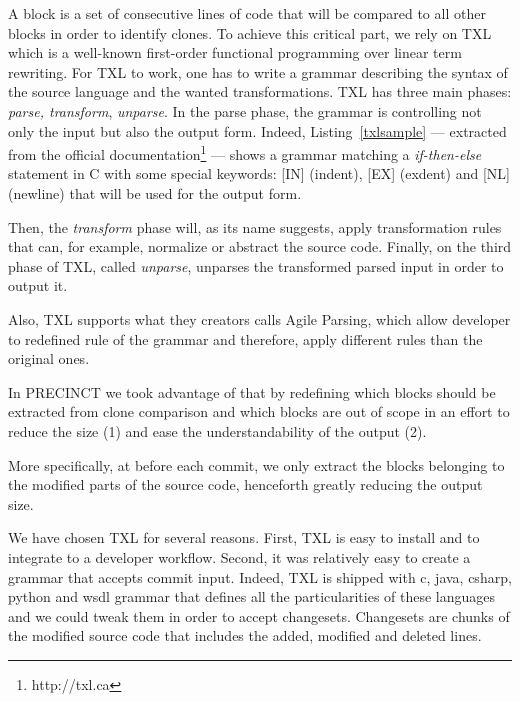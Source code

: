 \documentclass[conference]{IEEEtran}
\begin{document}
A block is a set of consecutive lines of code that will be compared to all other blocks in order to identify clones.
To achieve this critical part, we rely on TXL\cite{Cordy2006a} which is a well-known first-order functional programming over linear term rewriting.
For TXL to work, one has to write a grammar describing the syntax of the source  language and the wanted transformations.
TXL has three main phases: \textit{parse, transform}, \textit{unparse}.
In the parse phase, the grammar is controlling not only the input but also the output form. Indeed, Listing~\ref{txlsample} --- extracted from the official documentation\footnote{http://txl.ca} --- shows a grammar matching a \textit{if-then-else} statement in C with some special keywords: [IN] (indent), [EX] (exdent) and [NL] (newline) that will be used for the output form.

\noindent\begin{minipage}{0.90\linewidth}

  

\end{minipage}

Then, the \textit{transform} phase will, as its name suggests, apply transformation rules that can, for example, normalize or abstract the source code.
Finally, on the third phase of TXL,  called \textit{unparse}, unparses the transformed parsed input in order to output it.

Also, TXL supports what they creators calls Agile Parsing\cite{Dean}, which allow developer to redefined rule of the grammar and therefore, apply different rules than the original ones.


In PRECINCT we took advantage of that by redefining which blocks should be extracted from clone comparison and which blocks are out of scope in an effort to reduce the size (1) and ease the understandability of the output (2).


More specifically, at before each commit, we only extract the blocks belonging to the modified parts of the source code, henceforth greatly reducing the output size.

We have chosen TXL for several reasons.
First, TXL is easy to install and to integrate to a developer workflow.
Second, it was relatively easy to create a grammar that accepts commit input.
Indeed, TXL is shipped with c, java, csharp, python and wsdl grammar that defines all the particularities of these languages and we could tweak them in order to accept changesets.
Changesets are chunks of the modified source code that includes the added, modified and deleted lines.
\end{document}
